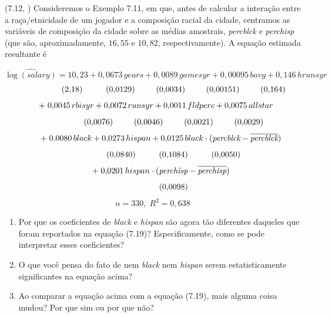 \documentclass[12pt,letterpaper, onecolumn]{exam}
\begin{document}
\begin{questions}
\vspace{0.7cm}

\question (7.12, \citep{wooldridge2016}) Consideremos o Exemplo 7.11, em que, antes de calcular a interação entre a raça/etnicidade de um jogador e a composição racial da cidade, centramos as variáveis de composição da cidade sobre as médias amostrais, \textit{percblck} e \textit{perchisp} (que são, aproximadamente, \(16{,}55\) e \(10{,}82\), respectivamente). A equação estimada resultante é

\[
\widehat{\log(salary)} = 10{,}23 + 0{,}0673\,years + 0{,}0089\,gamesyr + 0{,}00095\,bavg + 0{,}146\,hrunsyr
\]
\[
\hspace{1.8cm} (2{,}18)\hspace{1.0cm}(0{,}0129)\hspace{0.9cm}(0{,}0034)\hspace{0.9cm}(0{,}00151)\hspace{0.9cm}(0{,}164)
\]
\[
\hspace{0.3cm} +\; 0{,}0045\,rbisyr + 0{,}0072\,runsyr + 0{,}0011\,fldperc + 0{,}0075\,allstar
\]
\[
\hspace{1.8cm} (0{,}0076)\hspace{0.9cm}(0{,}0046)\hspace{0.9cm}(0{,}0021)\hspace{0.9cm}(0{,}0029)
\]
\[
\hspace{0.7cm} +\; 0{,}0080\,black + 0{,}0273\,hispan + 0{,}0125\,black \cdot (\textit{percblck} - \overline{\textit{percblck}})
\]
\[
\hspace{1.8cm} (0{,}0840)\hspace{1.0cm}(0{,}1084)\hspace{1.0cm}(0{,}0050)
\]
\[
\hspace{0.7cm} +\; 0{,}0201\,hispan \cdot (\textit{perchisp} - \overline{\textit{perchisp}})
\]
\[
\hspace{1.8cm} (0{,}0098)
\]
\[
n = 330,\; R^2 = 0{,}638
\]

\begin{enumerate}[label=(\roman*)]
    \item Por que os coeficientes de \textit{black} e \textit{hispan} são agora tão diferentes daqueles que foram reportados na equação (7.19)? Especificamente, como se pode interpretar esses coeficientes?
    \item O que você pensa do fato de nem \textit{black} nem \textit{hispan} serem estatisticamente significantes na equação acima?
    \item Ao comparar a equação acima com a equação (7.19), mais alguma coisa mudou? Por que sim ou por que não?
\end{enumerate}


\end{questions}
\end{document}
